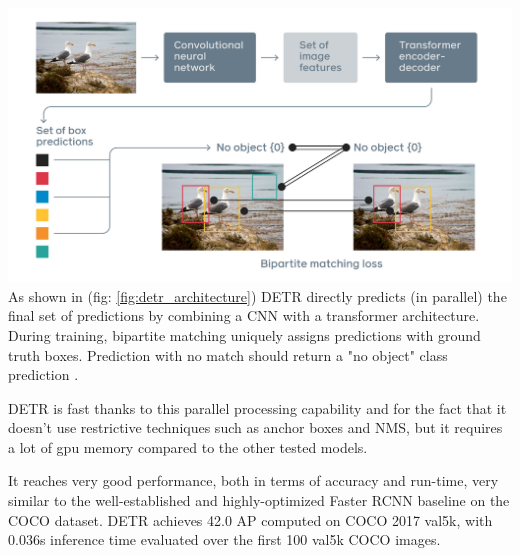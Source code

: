 \includegraphics[width=\textwidth]{Introduzione/imgs/detr_architecture.png}\label{fig:detr_architecture}
As shown in (fig: \ref{fig:detr_architecture}) DETR directly predicts (in parallel) the final set of predictions by combining
a CNN with a transformer architecture. \\During training, bipartite matching
uniquely assigns predictions with ground truth boxes. Prediction with no match should
return a "no object" class prediction \cite{detr_paper}.


DETR is fast thanks to this parallel processing capability and for the fact that it doesn't use restrictive techniques such as anchor boxes and NMS, but it requires a lot of gpu memory compared to the other tested models.

It reaches very good performance, both in terms of  accuracy and run-time, very similar to the well-established and highly-optimized Faster RCNN baseline on the COCO dataset.
DETR achieves 42.0 AP computed on COCO 2017 val5k, with 0.036s inference time evaluated over the first 100 val5k COCO images.